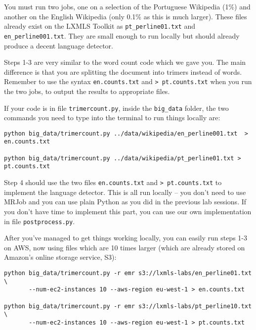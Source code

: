 You must run two jobs, one on a selection of the Portuguese Wikipedia (1\%) and
another on the English Wikipedia (only 0.1\% as this is much larger). These files already exist on the LXMLS Toolkit as \texttt{pt\_perline01.txt} and \texttt{en\_perline001.txt}. They are small enough to run locally but should already produce a decent language detector.

Steps 1-3 are very similar to the word count code which we gave you. The main difference is that you are splitting the document into trimers instead of words. Remember to use the syntax \texttt{en.counts.txt} and \texttt{> pt.counts.txt} when you run the two jobs, to output the results to appropriate files.

If your code is in file \texttt{trimercount.py}, inside the \texttt{big\_data} folder, the two commands you need to type into the terminal to run things locally are:

%
%

\begin{verbatim}
python big_data/trimercount.py ../data/wikipedia/en_perline001.txt  > en.counts.txt

python big_data/trimercount.py ../data/wikipedia/pt_perline01.txt > pt.counts.txt
\end{verbatim}

Step 4 should use the two files \texttt{en.counts.txt} and \texttt{> pt.counts.txt} to implement the language detector. This is all run locally -- you don't need to use MRJob and you can use plain Python as you did in the previous lab sessions. If you don't have time to implement this part, you can use our own implementation in file \texttt{postprocess.py}.

After you've managed to get things working locally, you can easily run steps 1-3 on AWS, now using files which are 10 times larger (which are already stored on Amazon's online storage service, S3):

\begin{verbatim}
python big_data/trimercount.py -r emr s3://lxmls-labs/en_perline01.txt \
       --num-ec2-instances 10 --aws-region eu-west-1 > en.counts.txt

python big_data/trimercount.py -r emr s3://lxmls-labs/pt_perline10.txt \
       --num-ec2-instances 10 --aws-region eu-west-1 > pt.counts.txt
\end{verbatim}

